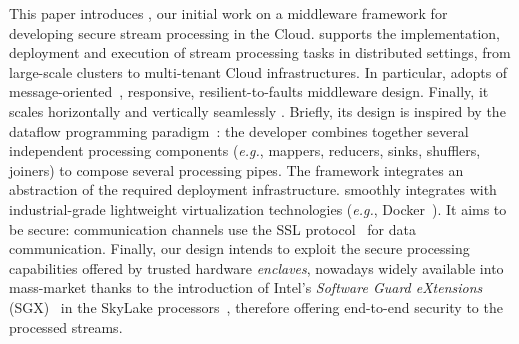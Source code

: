This paper introduces \SYS{}, our initial work on a middleware framework for developing secure stream processing in the Cloud.
\SYS{} supports the implementation, deployment and execution of stream processing tasks in distributed settings, from large-scale clusters to multi-tenant Cloud infrastructures.
In particular, \SYS{} adopts of message-oriented~\cite{mom}, responsive, resilient-to-faults middleware design.
Finally, it scales horizontally and vertically seamlessly  .
Briefly, its design is inspired by the dataflow programming paradigm~\cite{uustalu_essence_2005}: the developer combines together several independent processing components (\emph{e.g.}, mappers, reducers, sinks, shufflers, joiners) to compose several processing pipes.%
The framework integrates an abstraction of the required deployment infrastructure.
\SYS{} smoothly integrates with industrial-grade lightweight virtualization technologies (\emph{e.g.}, Docker~\cite{docker}).
It aims to be secure: communication channels use the SSL protocol~\cite{freier2011secure} for data communication.
Finally, our design intends to exploit the secure processing capabilities offered by trusted hardware \emph{enclaves}, nowadays widely available into mass-market thanks to the introduction of Intel's \emph{Software Guard eXtensions} (SGX)~\cite{costan_intel} in the SkyLake processors~\cite{skylake}, therefore offering end-to-end security to the processed streams.

